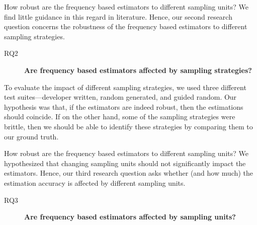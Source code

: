 \documentclass[sigconf,review,anonymous]{acmart}
\begin{document}

How robust are the frequency based estimators to different sampling units? We
find little guidance in this regard in literature.
Hence, our second
research question concerns the robustness of the frequency based estimators to
different sampling strategies.

\begin{description}
  \item[RQ2] \textbf{Are frequency based estimators affected by sampling strategies?}
\end{description}

To evaluate the impact of different sampling strategies, we used three different
test suites---developer written, random generated, and guided random.
Our hypothesis was that, if the estimators are indeed robust, then the
estimations should coincide. If on the other hand, some of the sampling strategies were brittle,
then we should be able to identify these strategies by comparing them to our
ground truth.

How robust are the frequency based estimators to different sampling units? We
hypothesized that changing sampling units should not significantly impact the
estimators.
Hence, our third research question asks whether (and how much) the estimation
accuracy is affected by different sampling units.

\begin{description}
  \item[RQ3] \textbf{Are frequency based estimators affected by sampling units?}%
\end{description}
\end{document}
